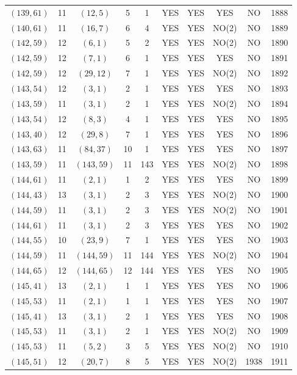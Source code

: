 \begin{longtable}{|c|c|c|c|c|c|c|c|c|c|}
$(139, 61)$ & 11 & $(12, 5)$ & 5 & 1 & YES & YES & YES & NO & 1888\\
$(140, 61)$ & 11 & $(16, 7)$ & 6 & 4 & YES & YES & NO(2) & NO & 1889\\
$(142, 59)$ & 12 & $(6, 1)$ & 5 & 2 & YES & YES & NO(2) & NO & 1890\\
$(142, 59)$ & 12 & $(7, 1)$ & 6 & 1 & YES & YES & YES & NO & 1891\\
$(142, 59)$ & 12 & $(29, 12)$ & 7 & 1 & YES & YES & NO(2) & NO & 1892\\
$(143, 54)$ & 12 & $(3, 1)$ & 2 & 1 & YES & YES & YES & NO & 1893\\
$(143, 59)$ & 11 & $(3, 1)$ & 2 & 1 & YES & YES & NO(2) & NO & 1894\\
$(143, 54)$ & 12 & $(8, 3)$ & 4 & 1 & YES & YES & YES & NO & 1895\\
$(143, 40)$ & 12 & $(29, 8)$ & 7 & 1 & YES & YES & YES & NO & 1896\\
$(143, 63)$ & 11 & $(84, 37)$ & 10 & 1 & YES & YES & YES & NO & 1897\\
$(143, 59)$ & 11 & $(143, 59)$ & 11 & 143 & YES & YES & NO(2) & NO & 1898\\
$(144, 61)$ & 11 & $(2, 1)$ & 1 & 2 & YES & YES & YES & NO & 1899\\
$(144, 43)$ & 13 & $(3, 1)$ & 2 & 3 & YES & YES & NO(2) & NO & 1900\\
$(144, 59)$ & 11 & $(3, 1)$ & 2 & 3 & YES & YES & NO(2) & NO & 1901\\
$(144, 61)$ & 11 & $(3, 1)$ & 2 & 3 & YES & YES & YES & NO & 1902\\
$(144, 55)$ & 10 & $(23, 9)$ & 7 & 1 & YES & YES & YES & NO & 1903\\
$(144, 59)$ & 11 & $(144, 59)$ & 11 & 144 & YES & YES & NO(2) & NO & 1904\\
$(144, 65)$ & 12 & $(144, 65)$ & 12 & 144 & YES & YES & YES & NO & 1905\\
$(145, 41)$ & 13 & $(2, 1)$ & 1 & 1 & YES & YES & YES & NO & 1906\\
$(145, 53)$ & 11 & $(2, 1)$ & 1 & 1 & YES & YES & YES & NO & 1907\\
$(145, 41)$ & 13 & $(3, 1)$ & 2 & 1 & YES & YES & YES & NO & 1908\\
$(145, 53)$ & 11 & $(3, 1)$ & 2 & 1 & YES & YES & NO(2) & NO & 1909\\
$(145, 53)$ & 11 & $(5, 2)$ & 3 & 5 & YES & YES & NO(2) & NO & 1910\\
$(145, 51)$ & 12 & $(20, 7)$ & 8 & 5 & YES & YES & NO(2) & 1938 & 1911\\

\end{longtable}
